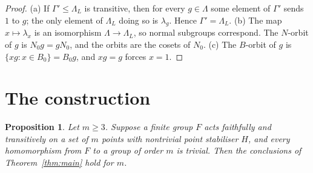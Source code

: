 \documentclass[11pt]{amsart}
\newtheorem{proposition}[theorem]{Proposition}
\theoremstyle{definition}
\theoremstyle{remark}
\begin{document}
\begin{proof}
(a) If $\Gamma'\le\Lambda_L$ is transitive, then for every $g\in\Lambda$ some element of $\Gamma'$ sends $1$ to $g$; the only element of $\Lambda_L$ doing so is $\lambda_g$. Hence $\Gamma'=\Lambda_L$. (b) The map $x\mapsto\lambda_x$ is an isomorphism $\Lambda\to\Lambda_L$, so normal subgroups correspond. The $N$-orbit of $g$ is $N_0g=gN_0$, and the orbits are the cosets of $N_0$. (c) The $B$-orbit of $g$ is $\{xg:x\in B_0\}=B_0g$, and $xg=g$ forces $x=1$.
\end{proof}

\section{The construction}

\begin{proposition}\label{prop:template}
Let $m\ge3$. Suppose a finite group $F$ acts faithfully and transitively on a set of $m$ points with nontrivial point stabiliser $H$, and every homomorphism from $F$ to a group of order $m$ is trivial. Then the conclusions of Theorem~\ref{thm:main} hold for $m$.
\end{proposition}
\end{document}
